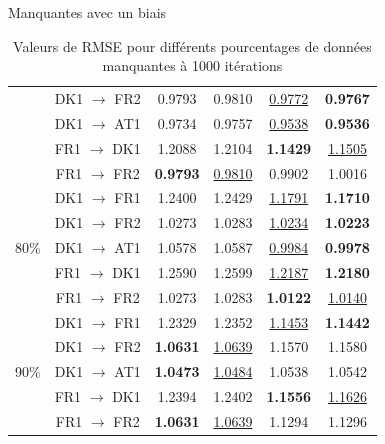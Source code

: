 \documentclass{beamer}
\begin{document}
\begin{frame}{Manquantes avec un biais}
\begin{center}
{\begin{minipage}{1.2\linewidth}
\begin{table}[H]
\begin{tabular}{| c | c | c | c | c | c |}
                                                & DK1 $\rightarrow$ FR2 & 0.9793 & 0.9810 & \underline{0.9772} & \textbf{0.9767} \\
                                                & DK1 $\rightarrow$ AT1 & 0.9734 & 0.9757 & \underline{0.9538} & \textbf{0.9536} \\
                                                & FR1 $\rightarrow$ DK1 & 1.2088 & 1.2104 & \textbf{1.1429} & \underline{1.1505} \\
                                                & FR1 $\rightarrow$ FR2 & \textbf{0.9793} & \underline{0.9810} & 0.9902 & 1.0016 \\
                        \hline 
                        \multirow{5}{4em}{80\%} & DK1 $\rightarrow$ FR1 & 1.2400 & 1.2429 & \underline{1.1791} & \textbf{1.1710} \\
                                                & DK1 $\rightarrow$ FR2 & 1.0273 & 1.0283 & \underline{1.0234} & \textbf{1.0223} \\
                                                & DK1 $\rightarrow$ AT1 & 1.0578 & 1.0587 & \underline{0.9984} & \textbf{0.9978} \\
                                                & FR1 $\rightarrow$ DK1 & 1.2590 & 1.2599 & \underline{1.2187} & \textbf{1.2180} \\
                                                & FR1 $\rightarrow$ FR2 & 1.0273 & 1.0283 & \textbf{1.0122} & \underline{1.0140} \\
                        \hline
                        \multirow{5}{4em}{90\%} & DK1 $\rightarrow$ FR1 & 1.2329 & 1.2352 & \underline{1.1453} & \textbf{1.1442} \\
                                                & DK1 $\rightarrow$ FR2 & \textbf{1.0631} & \underline{1.0639} & 1.1570 & 1.1580 \\
                                                & DK1 $\rightarrow$ AT1 & \textbf{1.0473} & \underline{1.0484} & 1.0538 & 1.0542 \\
                                                & FR1 $\rightarrow$ DK1 & 1.2394 & 1.2402 & \textbf{1.1556} & \underline{1.1626} \\
                                                & FR1 $\rightarrow$ FR2 & \textbf{1.0631} & \underline{1.0639} & 1.1294 & 1.1296 \\
                        \hline 
                    \end{tabular}
                \caption{Valeurs de RMSE pour différents pourcentages de données manquantes à 1000 itérations}    
                \end{table}
            \end{minipage}%
        }
    \end{center}
\end{frame}
\end{document}

